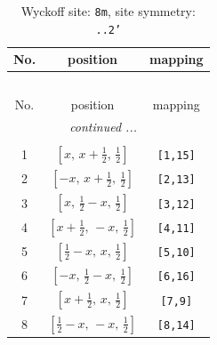 \documentclass[fleqn,8pt]{jsarticle}
\begin{document}
\begin{longtable}{ccc}
\caption{Wyckoff site: {\tt 8m}, site symmetry: {\tt ..2'}}
 \\
 \hline \hline
No. & position & mapping \\ \hline \endfirsthead

\multicolumn{2}{l}{\tablename\ \thetable{}} \\
 \hline \hline
No. & position & mapping \\ \hline \endhead

 \hline \hline
\multicolumn{2}{r}{\footnotesize\it continued ...} \\ \endfoot

 \hline \hline
\multicolumn{2}{r}{} \\ \endlastfoot

1 & $\left[ x,\, x + \frac{1}{2},\, \frac{1}{2} \right]$ & {\tt [1,15]} \\ \hline
2 & $\left[ - x,\, x + \frac{1}{2},\, \frac{1}{2} \right]$ & {\tt [2,13]} \\ \hline
3 & $\left[ x,\, \frac{1}{2} - x,\, \frac{1}{2} \right]$ & {\tt [3,12]} \\ \hline
4 & $\left[ x + \frac{1}{2},\, - x,\, \frac{1}{2} \right]$ & {\tt [4,11]} \\ \hline
5 & $\left[ \frac{1}{2} - x,\, x,\, \frac{1}{2} \right]$ & {\tt [5,10]} \\ \hline
6 & $\left[ - x,\, \frac{1}{2} - x,\, \frac{1}{2} \right]$ & {\tt [6,16]} \\ \hline
7 & $\left[ x + \frac{1}{2},\, x,\, \frac{1}{2} \right]$ & {\tt [7,9]} \\ \hline
8 & $\left[ \frac{1}{2} - x,\, - x,\, \frac{1}{2} \right]$ & {\tt [8,14]} \\
\end{longtable}
\renewcommand{\arraystretch}{1.2}
\end{document}
